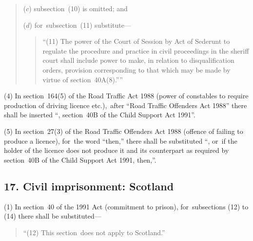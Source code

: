 \documentclass[12pt,a4paper]{article}
\begin{document}
\begin{quotation}
\begin{enumerate}
($c$) subsection~(10)  is omitted; and

($d$) for~subsection~(11)  substitute—
\begin{quotation}
“(11) The power of the Court of Session by Act of Sederunt to regulate the procedure and practice in civil proceedings in the sheriff court shall include power to make, in relation to disqualification orders, provision corresponding to that which may be made by virtue of section~40A(8).””
\end{quotation}
\end{enumerate}
\end{quotation}

(4) In section~164(5)  of the Road Traffic Act 1988 (power of constables to require production of driving licence etc.),\ after “Road Traffic Offenders Act 1988” there shall be inserted “, section~40B of the Child Support Act 1991”.

(5) In section~27(3)  of the Road Traffic Offenders Act 1988 (offence of failing to produce a licence), for~the word “then,” there shall be substituted “, or~if the holder of the licence does not produce it and its counterpart as required by section~40B of the Child Support Act 1991, then,”.


\subsection{17. Civil imprisonment: Scotland}

(1) In section~40 of the 1991 Act (commitment to prison), for~subsections (12)  to (14)  there shall be substituted—
\begin{quotation}
“(12) This section~does not apply to Scotland.”
\end{quotation}
\end{document}
